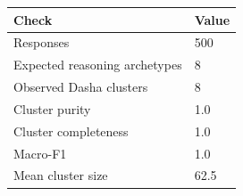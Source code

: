 \begin{tabular}{ll}
\toprule
Check & Value \\
\midrule
Responses & 500 \\
Expected reasoning archetypes & 8 \\
Observed Dasha clusters & 8 \\
Cluster purity & 1.0 \\
Cluster completeness & 1.0 \\
Macro-F1 & 1.0 \\
Mean cluster size & 62.5 \\
\bottomrule
\end{tabular}
